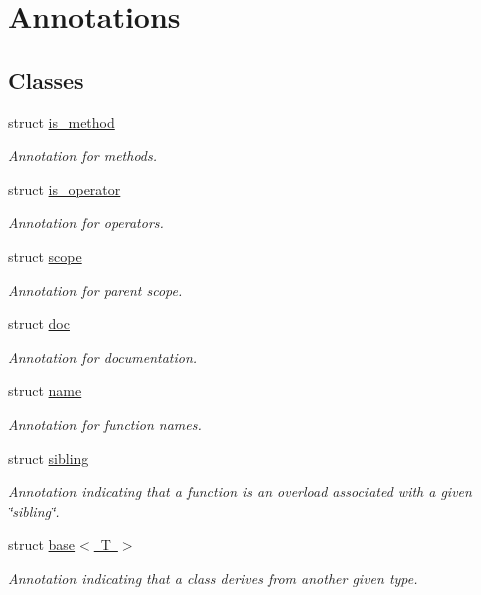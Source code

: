 \hypertarget{group__annotations}{}\section{Annotations}
\label{group__annotations}
\subsection*{Classes}
\begin{DoxyCompactItemize}
\item 
struct \mbox{\hyperlink{structis__method}{is\+\_\+method}}
\begin{DoxyCompactList}\small\item\em Annotation for methods. \end{DoxyCompactList}\item 
struct \mbox{\hyperlink{structis__operator}{is\+\_\+operator}}
\begin{DoxyCompactList}\small\item\em Annotation for operators. \end{DoxyCompactList}\item 
struct \mbox{\hyperlink{structscope}{scope}}
\begin{DoxyCompactList}\small\item\em Annotation for parent scope. \end{DoxyCompactList}\item 
struct \mbox{\hyperlink{structdoc}{doc}}
\begin{DoxyCompactList}\small\item\em Annotation for documentation. \end{DoxyCompactList}\item 
struct \mbox{\hyperlink{structname}{name}}
\begin{DoxyCompactList}\small\item\em Annotation for function names. \end{DoxyCompactList}\item 
struct \mbox{\hyperlink{structsibling}{sibling}}
\begin{DoxyCompactList}\small\item\em Annotation indicating that a function is an overload associated with a given \char`\"{}sibling\char`\"{}. \end{DoxyCompactList}\item 
struct \mbox{\hyperlink{structbase}{base$<$ T $>$}}
\begin{DoxyCompactList}\small\item\em Annotation indicating that a class derives from another given type. \end{DoxyCompactList}\item 

\end{DoxyCompactItemize}
